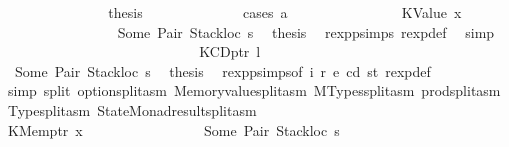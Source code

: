 \begin{isabellebody}
\ \ \ \ \ \ \ \ \ \ \ \ \isamarkupfalse%
\ \isamarkupfalse%
\ {\isacharquery}{\kern0pt}thesis\isanewline
\ \ \ \ \ \ \ \ \ \ \ \ \isamarkupfalse%
\ {\isacharparenleft}{\kern0pt}cases\ a{\isacharparenright}{\kern0pt}\isanewline
\ \ \ \ \ \ \ \ \ \ \ \ \ \ \isamarkupfalse%
\ {\isacharparenleft}{\kern0pt}KValue\ x{}{\isacharparenright}{\kern0pt}\isanewline
\ \ \ \ \ \ \ \ \ \ \ \ \ \ \isamarkupfalse%
\ {}{}{\isacharparenleft}{\kern0pt}{}{\isacharparenright}{\kern0pt}\ Some\ Pair\ Stackloc\ s{}\ \isamarkupfalse%
\ {\isacharquery}{\kern0pt}thesis\ \isamarkupfalse%
\ rexp{\isachardot}{\kern0pt}psimps{\isacharparenleft}{\kern0pt}{}{\isacharparenright}{\kern0pt}\ rexp{\isacharunderscore}{\kern0pt}def\ \isamarkupfalse%
\ simp\isanewline
\ \ \ \ \ \ \ \ \ \ \ \ \isamarkupfalse%
\isanewline
\ \ \ \ \ \ \ \ \ \ \ \ \ \ \isamarkupfalse%
\ {\isacharparenleft}{\kern0pt}KCDptr\ l{\isacharprime}{\kern0pt}{\isacharparenright}{\kern0pt}\isanewline
\ \ \ \ \ \ \ \ \ \ \ \ \ \ \isamarkupfalse%
\ {}{}\ Some\ Pair\ Stackloc\ s{}\ \isamarkupfalse%
\ {\isacharquery}{\kern0pt}thesis\ \isamarkupfalse%
\ rexp{\isachardot}{\kern0pt}psimps{\isacharparenleft}{\kern0pt}{}{\isacharparenright}{\kern0pt}{\isacharbrackleft}{\kern0pt}of\ i\ r\ e\ cd\ st{\isacharbrackright}{\kern0pt}\ rexp{\isacharunderscore}{\kern0pt}def\ \isamarkupfalse%
\ {\isacharparenleft}{\kern0pt}simp\ split{\isacharcolon}{\kern0pt}\ option{\isachardot}{\kern0pt}split{\isacharunderscore}{\kern0pt}asm\ Memoryvalue{\isachardot}{\kern0pt}split{\isacharunderscore}{\kern0pt}asm\ MTypes{\isachardot}{\kern0pt}split{\isacharunderscore}{\kern0pt}asm\ prod{\isachardot}{\kern0pt}split{\isacharunderscore}{\kern0pt}asm\ Type{\isachardot}{\kern0pt}split{\isacharunderscore}{\kern0pt}asm\ StateMonad{\isachardot}{\kern0pt}result{\isachardot}{\kern0pt}split{\isacharunderscore}{\kern0pt}asm{\isacharparenright}{\kern0pt}\isanewline
\ \ \ \ \ \ \ \ \ \ \ \ \isamarkupfalse%
\isanewline
\ \ \ \ \ \ \ \ \ \ \ \ \ \ \isamarkupfalse%
\ {\isacharparenleft}{\kern0pt}KMemptr\ x{}{\isacharparenright}{\kern0pt}\isanewline
\ \ \ \ \ \ \ \ \ \ \ \ \ \ \isamarkupfalse%
\ {}{}\ Some\ Pair\ Stackloc\ s{}\ \isamarkupfalse%

\end{isabellebody}
